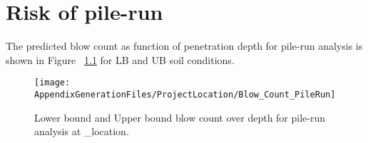 \chapter{Risk of pile-run}\label{sec_1}

The predicted blow count as function of penetration depth for pile-run analysis
is shown in Figure ~\ref{blow_count_PileRun} for LB and UB soil conditions.

\begin{figure}[!htbp]
\texttt{[image: AppendixGenerationFiles/ProjectLocation/Blow\_Count\_PileRun]}
\caption{Lower bound and Upper bound blow count over depth for pile-run analysis at  {\ID_location}.}
\label{blow_count_PileRun}\end{figure}

\newpage



